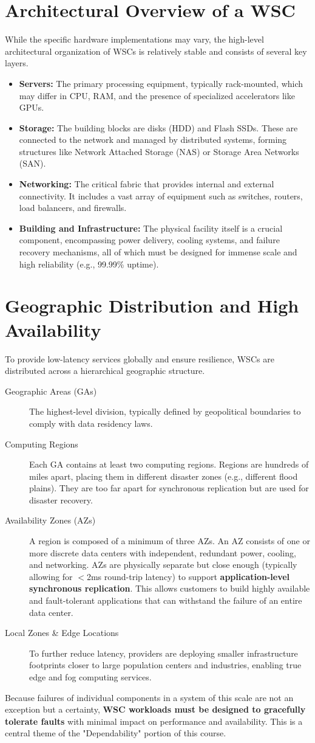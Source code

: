 \section{Architectural Overview of a WSC}
While the specific hardware implementations may vary, the high-level architectural organization of WSCs is relatively stable and consists of several key layers.
\begin{itemize}
    \item \textbf{Servers:} The primary processing equipment, typically rack-mounted, which may differ in CPU, RAM, and the presence of specialized accelerators like GPUs.
    \item \textbf{Storage:} The building blocks are disks (HDD) and Flash SSDs. These are connected to the network and managed by distributed systems, forming structures like Network Attached Storage (NAS) or Storage Area Networks (SAN).
    \item \textbf{Networking:} The critical fabric that provides internal and external connectivity. It includes a vast array of equipment such as switches, routers, load balancers, and firewalls.
    \item \textbf{Building and Infrastructure:} The physical facility itself is a crucial component, encompassing power delivery, cooling systems, and failure recovery mechanisms, all of which must be designed for immense scale and high reliability (e.g., 99.99\% uptime).
\end{itemize}

\section{Geographic Distribution and High Availability}
To provide low-latency services globally and ensure resilience, WSCs are distributed across a hierarchical geographic structure.
\begin{description}
    \item[Geographic Areas (GAs)] The highest-level division, typically defined by geopolitical boundaries to comply with data residency laws.
    \item[Computing Regions] Each GA contains at least two computing regions. Regions are hundreds of miles apart, placing them in different disaster zones (e.g., different flood plains). They are too far apart for synchronous replication but are used for disaster recovery.
    \item[Availability Zones (AZs)] A region is composed of a minimum of three AZs. An AZ consists of one or more discrete data centers with independent, redundant power, cooling, and networking. AZs are physically separate but close enough (typically allowing for $<$2ms round-trip latency) to support \textbf{application-level synchronous replication}. This allows customers to build highly available and fault-tolerant applications that can withstand the failure of an entire data center.
    \item[Local Zones \& Edge Locations] To further reduce latency, providers are deploying smaller infrastructure footprints closer to large population centers and industries, enabling true edge and fog computing services.
\end{description}

Because failures of individual components in a system of this scale are not an exception but a certainty, \textbf{WSC workloads must be designed to gracefully tolerate faults} with minimal impact on performance and availability. This is a central theme of the "Dependability" portion of this course.